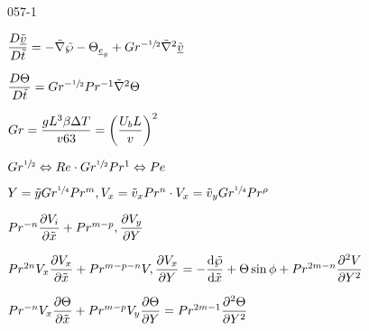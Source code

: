 \begin{mitframe}{057-1}
        \item $\dfrac{\elecdisplace\uline{\tilde{\vvel}}}{\elecdisplace\tilde{t}}=-\tilde{\nabla}\tilde{\dynpress}-\dimltemp_{\mcef_{\grav}}+\grashof^{-\sfrac{1}{2}}\tilde{\nabla}^2\uline{\tilde{\vvel}}$
        \item $\dfrac{\elecdisplace\dimltemp}{\elecdisplace\tilde{t}}=\grashof^{-\sfrac{1}{2}}\prandtl^{-1}\tilde{\nabla}^2\dimltemp$
        \item $\grashof=\dfrac{\grav\length^3\texpcoeff\iipf\Temp}{\vvel63}=\bigg(\dfrac{\uvel_{b}\length}{\vvel}\bigg)^2$
\item $\grashof^{\sfrac{1}{2}}\Leftrightarrow\reynolds\cdot\grashof^{\sfrac{1}{2}}\prandtl^1\Leftrightarrow\peclet$
\item $Y=\tilde{y}\grashof^{\sfrac{1}{4}}\prandtl^{m}, \vol_{\disp}=\tilde{\vvel}_{\disp}\prandtl^n\cdot\vol_{\disp}=\tilde{\vvel}_y\grashof^{\sfrac{1}{4}}\prandtl^{\dens}$
\item $\prandtl^{-n}\dfrac{\partial\vol_{\state}}{\partial\tilde{\disp}}+\prandtl^{m-p}, \dfrac{\partial\vol_{y}}{\partial{Y}}$
\item $\prandtl^{2n}\vol_{\disp}\dfrac{\partial\vol_{\disp}}{\partial\tilde{\disp}}+\prandtl^{m-p-n}\vol, \dfrac{\partial\vol_{\disp}}{\partial{Y}}=-\dfrac{\mathrm{d}\tilde{\dynpress}}{\mathrm{d}\tilde{\disp}}+\dimltemp\sin\eleccoeff+\prandtl^{2m-n}\dfrac{\partial^2\vol}{\partial{Y}^2}$
\item $\prandtl^{-n}\vol_{\disp}\dfrac{\partial\dimltemp}{\partial\tilde{\disp}}+\prandtl^{m-p}\vol_{y}\dfrac{\partial\dimltemp}{\partial{Y}}=\prandtl^{2m-1}\dfrac{\partial^2\dimltemp}{\partial{Y}^2}$

\end{mitframe}